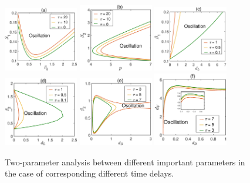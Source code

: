 \documentclass{CMHPhD-SIVD}
\begin{document}
\begin{figure}[h!]
\centering
\includegraphics[height=0.15\textheight,width=0.29\textwidth]{A3.eps}
\includegraphics[height=0.15\textheight,width=0.29\textwidth]{A6.eps}
\includegraphics[height=0.15\textheight,width=0.29\textwidth]{A7.eps}
\includegraphics[height=0.15\textheight,width=0.29\textwidth]{A8.eps}
\includegraphics[height=0.15\textheight,width=0.29\textwidth]{A9.eps}
\includegraphics[height=0.15\textheight,width=0.29\textwidth]{A10.eps}
\vspace{3mm}
\caption{Two-parameter analysis between different important parameters in the case of corresponding different time delays.}
\label{Fig.8}
\end{figure}
\end{document}
